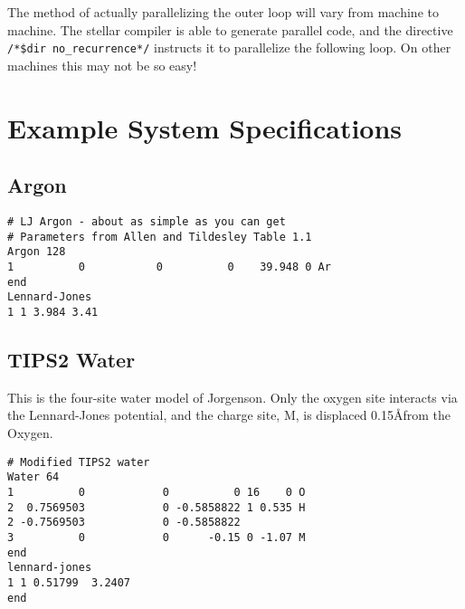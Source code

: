 The method of actually parallelizing the outer loop will vary from
machine to machine. The stellar compiler is able to generate parallel
code, and the directive \verb'/*$dir'~\verb'no_recurrence*/' instructs
it to parallelize the following loop.  On other machines this may not
be so easy!
\appendix
\chapter{Example System Specifications}  %
\label{sec:examples}
\section{Argon}%
\begin{verbatim}
# LJ Argon - about as simple as you can get
# Parameters from Allen and Tildesley Table 1.1
Argon 128
1          0           0          0    39.948 0 Ar
end
Lennard-Jones
1 1 3.984 3.41
\end{verbatim}
\section{TIPS2 Water}%
This is the four-site water model of Jorgenson\cite{jorgensen:82}.  
Only the oxygen site interacts via the Lennard-Jones
potential, and the charge site, M, is displaced 0.15\AA from the Oxygen.
\begin{verbatim}
# Modified TIPS2 water
Water 64
1          0            0          0 16    0 O
2  0.7569503            0 -0.5858822 1 0.535 H
2 -0.7569503            0 -0.5858822
3          0            0      -0.15 0 -1.07 M
end
lennard-jones
1 1 0.51799  3.2407
end
\end{verbatim}
